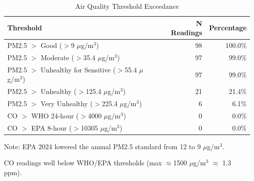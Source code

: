 \begin{table}[htbp]
\centering
\caption{Air Quality Threshold Exceedance}
\label{tab:thresholds}
\begin{tabular}{lrr}
\toprule
Threshold & N Readings & Percentage \\
\midrule
PM2.5 $>$ Good ($>$9 $\mu$g/m$^3$) & 98 & 100.0\% \\
PM2.5 $>$ Moderate ($>$35.4 $\mu$g/m$^3$) & 97 & 99.0\% \\
PM2.5 $>$ Unhealthy for Sensitive ($>$55.4 $\mu$g/m$^3$) & 97 & 99.0\% \\
PM2.5 $>$ Unhealthy ($>$125.4 $\mu$g/m$^3$) & 21 & 21.4\% \\
PM2.5 $>$ Very Unhealthy ($>$225.4 $\mu$g/m$^3$) & 6 & 6.1\% \\
\midrule
CO $>$ WHO 24-hour ($>$4000 $\mu$g/m$^3$) & 0 & 0.0\% \\
CO $>$ EPA 8-hour ($>$10305 $\mu$g/m$^3$) & 0 & 0.0\% \\
\bottomrule
\end{tabular}
\begin{tablenotes}
\small
\item Note: EPA 2024 lowered the annual PM2.5 standard from 12 to 9 $\mu$g/m$^3$.
\item CO readings well below WHO/EPA thresholds (max $\approx$1500 $\mu$g/m$^3$ $\approx$ 1.3 ppm).
\end{tablenotes}
\end{table}
